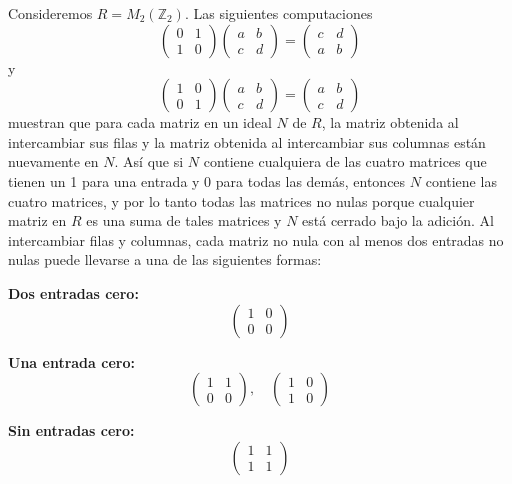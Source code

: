 \begin{enumerate}
Consideremos $R = M_2(\mathbb{Z}_2)$. Las siguientes computaciones
\[
\begin{pmatrix}
0 & 1 \\
1 & 0
\end{pmatrix}
\begin{pmatrix}
a & b \\
c & d
\end{pmatrix}
=
\begin{pmatrix}
c & d \\
a & b
\end{pmatrix}
\]
y
\[
\begin{pmatrix}
1 & 0 \\
0 & 1
\end{pmatrix}
\begin{pmatrix}
a & b \\
c & d
\end{pmatrix}
=
\begin{pmatrix}
a & b \\
c & d
\end{pmatrix}
\]
muestran que para cada matriz en un ideal $N$ de $R$, la matriz obtenida al intercambiar sus filas y la matriz obtenida al intercambiar sus columnas están nuevamente en $N$. Así que si $N$ contiene cualquiera de las cuatro matrices que tienen un 1 para una entrada y 0 para todas las demás, entonces $N$ contiene las cuatro matrices, y por lo tanto todas las matrices no nulas porque cualquier matriz en $R$ es una suma de tales matrices y $N$ está cerrado bajo la adición. Al intercambiar filas y columnas, cada matriz no nula con al menos dos entradas no nulas puede llevarse a una de las siguientes formas:

\textbf{Dos entradas cero:}
\[
\begin{pmatrix}
1 & 0 \\
0 & 0
\end{pmatrix}
\]

\textbf{Una entrada cero:}
\[
\begin{pmatrix}
1 & 1 \\
0 & 0
\end{pmatrix}
, \quad
\begin{pmatrix}
1 & 0 \\
1 & 0
\end{pmatrix}
\]

\textbf{Sin entradas cero:}
\[
\begin{pmatrix}
1 & 1 \\
1 & 1
\end{pmatrix}
\]


\end{enumerate}
